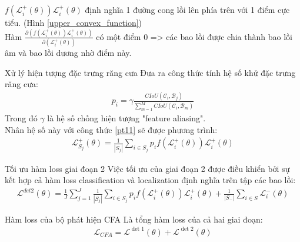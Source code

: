 \documentclass[11pt]{beamer}
\theoremstyle{definition}
\theoremstyle{plain}
\theoremstyle{plain}
\theoremstyle{remark}
\begin{document}
	\begin{frame}
		$f\left(\mathcal{L}_i^{+}(\theta)\right) \mathcal{L}_i^{+}(\theta)$ định nghĩa 1 đường cong lồi lên phía trên với 1 điểm cực tiểu. (Hình \ref{upper_convex_function})\\
		Hàm	$\frac{\partial\left(f\left(\mathcal{L}_i^{+}(\theta)\right) \mathcal{L}_i^{+}(\theta)\right)}{\partial\left(\mathcal{L}_i^{+}(\theta)\right)}$ có một điểm 0 => các bao lồi được chia thành bao lồi âm và bao lồi dương nhờ điểm này.\\
		
	\end{frame}
	\begin{frame}{Xử lý hiện tượng đặc trưng răng cưa}
		Đưa ra công thức tính hệ số khử đặc trưng răng cưa:
		\begin{align} \label{ptdd8}
			p_i = \gamma \frac{CIoU (\mathcal{C}_i, \mathcal{B}_j)}{\sum_{m=1}^{M} CIoU (\mathcal{C}_i, \mathcal{B}_m)}
		\end{align}
		Trong đó $\gamma$ là hệ số chống hiện tượng "feature aliasing".\\
		Nhân hệ số này với công thức \ref{pt11} sẽ được phương trình:
		\begin{align} \label{pt13}
			\mathcal{L}_{S_j}^+ (\theta) = \frac{1}{|S_j|} \sum_{i \in {S_j}} p_i f(\mathcal{L}_i^+(\theta)) \mathcal{L}_i^{+}(\theta) 
		\end{align}
		
		
	\end{frame}
	\begin{frame}{Tối ưu hàm loss giai đoạn 2}
		Việc tối ưu của giai đoạn 2 được điều khiển bởi sự kết hợp cả hàm loss classification và localization định nghĩa trên tập các bao lồi:\\
		\begin{align} \label{ptdd10}
			\mathcal{L}^{det2} (\theta) = \frac{1}{J} \sum_{j=1}^{J} \frac{1}{|S_j|} \sum_{i \in {S_j}} p_i f(\mathcal{L}_i^+(\theta)) \mathcal{L}_i^{+}(\theta)  + \frac{1}{|S_-|} \sum_{i \in S} \mathcal{L}_i^- (\theta) 
		\end{align}
	\end{frame}
	\begin{frame}{Hàm loss của bộ phát hiện CFA}
		Là tổng hàm loss của cả hai giai đoạn:
		\begin{align}
			\mathcal{L}_{CFA} = \mathcal{L}^{\operatorname{det} 1}(\theta)+\mathcal{L}^{\operatorname{det} 2}(\theta)
		\end{align}
		
	\end{frame}
	
\end{document}
